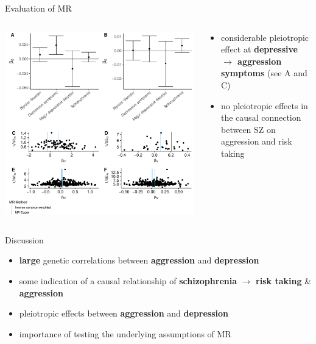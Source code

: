 \documentclass{beamer}
\begin{document}
\begin{frame}[t]{Evaluation of MR}
  \tiny
  \begin{columns}[T]
    \begin{column}[T]{0.6\textwidth}
      \includegraphics[width=0.99\linewidth]{../ukb_psychiatric/figures/sensitvity_plot.pdf}
    \end{column}
    \begin{column}[T]{0.4\textwidth}
      \begin{itemize}
        \item considerable pleiotropic effect at \textbf{depressive $\rightarrow$ aggression symptoms} (see A and C)
        \item no pleiotropic effects in the causal connection between SZ on aggression and risk taking 
      \end{itemize}
    \end{column}
  \end{columns}
\end{frame}

\begin{frame}[t]{Discussion}
  \begin{itemize}
    \item \textbf{large} genetic correlations between \textbf{aggression} and \textbf{depression}
    \item some indication of a causal relationship of \textbf{schizophrenia} $\rightarrow$ \textbf{risk taking} \& \textbf{aggression}
    \item pleiotropic effects between \textbf{aggression} and \textbf{depression} 
    \item importance of testing the underlying assumptions of MR
  \end{itemize} 
\end{frame}
\end{document}
